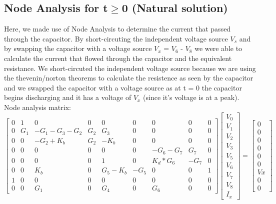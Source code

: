 \subsection{Node Analysis for t$\geq$0 (Natural solution)}
\label{subsec:node}
\tab Here, we made use of Node Analysis to determine the current that passed through the capacitor. By short-circuting the independent voltage source $V_s$ and by swapping the capacitor with a voltage source $V_x$ = $V_6$ - $V_8$ we were able to calculate the current that flowed through the capacitor and the equivalent resistance. We short-circuted the independent voltage source because we are using the thevenin/norton theorems to calculate the resistence as seen by the capacitor and we swapped the capacitor with a voltage source as at t = 0 the capacitor begins discharging and it has a voltage of $V_x$ (since it's voltage is at a peak). 
Node analysis matrix:
\begin{equation}
\begin{bmatrix}
  0 & 1 & 0 & 0 & 0 & 0 & 0 & 0 & 0 \\
  0 & G_1 & -G_1-G_3-G_2 & G_2 & G_3 & 0 & 0 & 0 & 0 \\
  0 & 0 & -G_2+K_b & G_2 & -K_b & 0 & 0 & 0 & 0 \\
  0 & 0 & 0 & 0 & 0 & 0 & -G_6-G_7 & G_7 & 0 \\
  0 & 0 & 0 & 0 & 1 & 0 & K_d*G_6 & -G_7 & 0 \\
  0 & 0 & K_b & 0 & G_5-K_b & -G_5 & 0 & 0 & 1 \\
  1 & 0 & 0 & 0 & 0 & 0 & 0 & 0 & 0 \\
  0 & 0 & G_1 & 0 & G_4 & 0 & G_6 & 0 & 0
\end{bmatrix}
\begin{bmatrix}
  V_0 \\ V_1 \\ V_2 \\ V_3 \\ V_5 \\ V_6 \\ V_7 \\ V_8 \\ I_x
\end{bmatrix}
=
\begin{bmatrix}
  0 \\ 0 \\ 0 \\ 0 \\ 0 \\ 0 \\ Vx \\ 0 \\ 0
\end{bmatrix}
\end{equation}

